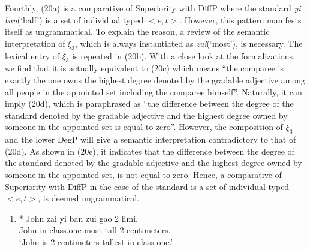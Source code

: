 \documentclass{ctexart}
\begin{document}
Fourthly, (20a) is a comparative of Superiority with DiffP where the standard \textit{yi ban}(`half') is a set of individual typed $<e,t>$. However, this pattern manifests itself as ungrammatical. To explain the reason, a review of the semantic interpretation of $\xi_3$, which is always instantiated as \textit{zui}(`most'), is necessary. The lexical entry of $\xi_3$ is repeated in (20b). With a close look at the formalizations, we find that it is actually equivalent to (20c) which means ``the comparee is exactly the one owns the highest degree denoted by the gradable adjective among all people in the appointed set including the comparee himself''. Naturally, it can imply (20d), which is paraphrased as ``the difference between the degree  of the standard denoted by the gradable adjective and the highest degree owned by someone in the appointed set is equal to zero''. However, the composition of $\xi_3$ and the lower DegP will give a semantic interpretation contradictory to that of (20d). As shown in (20e), it indicates that the difference between the degree of the standard denoted by the gradable adjective and the highest degree owned by someone in the appointed set, is not equal to zero. Hence, a comparative of Superiority with DiffP in the case of the standard is a set of individual typed $<e,t>$, is deemed ungrammatical.

\begin{enumerate}
    \item \label{maomao20_a}
    * John zai yi ban zui gao 2 limi. \\
    \hspace*{0.5em} John in class.one most tall 2 centimeters. \\
    \hspace*{0.5em} `John is 2 centimeters tallest in class one.'
\end{enumerate}
\end{document}
